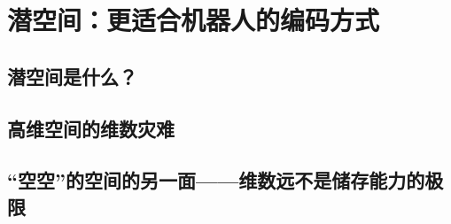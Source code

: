 \section{潜空间：更适合机器人的编码方式}
\subsection{潜空间是什么？}
\subsection{高维空间的维数灾难}
\subsection{“空空”的空间的另一面——维数远不是储存能力的极限}